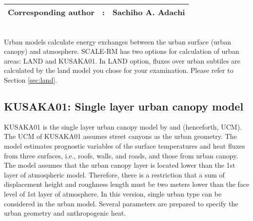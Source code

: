 {\bf \Large
\begin{tabular}{ccc}
\hline
  Corresponding author & : & Sachiho A. Adachi\\
\hline
\end{tabular}
}
\\


Urban models calculate energy exchanges between the urban surface (urban canopy) and atmosphere.
SCALE-RM has two options for calculation of urban areas: LAND and KUSAKA01.
In LAND option, fluxes over urban subtiles are calculated by the land model you chose for your examination.
Please refer to Section \ref{sec:land}.

\subsection{KUSAKA01: Single layer urban canopy model}

KUSAKA01 is the single layer urban canopy model by \citet{kusaka_2001} and \citet{kusaka_2004} (henceforth, UCM).
The UCM of KUSAKA01 assumes street canyons as the urban geometry.
The model estimates prognostic variables of the surface temperatures and heat fluxes from three surfaces, i.e., roofs, walls, and roads,
and those from urban canopy.
The model assumes that the urban canopy layer is located lower than the 1st layer of atmospheric model.
Therefore, there is a restriction that a sum of displacement height and roughness length must be two meters lower than the face level of 1st layer of atmosphere.
In this version, single urban type can be considered in the urban model.
Several parameters are prepared to specify the urban geometry and anthropogenic heat. 
